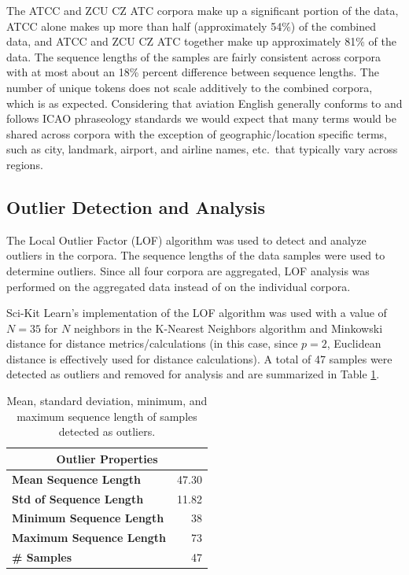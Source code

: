 \documentclass[12pt]{article}
\begin{document}
The ATCC and ZCU CZ ATC corpora make up a significant portion of the data, ATCC alone makes up more than half (approximately 54\%) of the combined
data, and ATCC and ZCU CZ ATC together make up approximately 81\% of the data. The sequence lengths of the samples are fairly consistent across
corpora with at most about an 18\% percent difference between sequence lengths. The number of unique tokens does not scale additively to the
combined corpora, which is as expected. Considering that aviation English generally conforms to and follows ICAO phraseology standards we would expect
that many terms would be shared across corpora with the exception of geographic/location specific terms, such as city, landmark, airport, and airline
names, etc.~that typically vary across regions.

\subsection{Outlier Detection and Analysis}\label{sec:outliers}
The Local Outlier Factor (LOF) algorithm \cite{breunig_lof_2000} was used to detect and analyze outliers in the corpora. The sequence lengths of the
data samples were used to determine outliers. Since all four corpora are aggregated, LOF analysis was performed on the aggregated data instead of on
the individual corpora.

Sci-Kit Learn's \cite{pedregosa_scikit-learn_2011} implementation of the LOF algorithm was used with a value of \(N = 35\) for \(N\) neighbors in the
K-Nearest Neighbors algorithm and Minkowski distance for distance metrics/calculations (in this case, since \(p=2\), Euclidean distance is effectively
used for distance calculations). A total of 47 samples were detected as outliers and removed for analysis and are summarized in Table
\ref{tab:outlier_stats}.

\begin{table}[!t]
    \centering
    \begin{tabular}{l | r}
        \toprule
        \multicolumn{2}{c}{Outlier Properties}   \\
        \midrule
        \textbf{Mean Sequence Length}    & 47.30 \\
        \textbf{Std of Sequence Length}  & 11.82 \\
        \textbf{Minimum Sequence Length} & 38    \\
        \textbf{Maximum Sequence Length} & 73    \\
        \textbf{\# Samples}              & 47    \\
        \bottomrule
    \end{tabular}
    \caption{Mean, standard deviation, minimum, and maximum sequence length of samples detected as outliers.}
    \label{tab:outlier_stats}
\end{table}
\end{document}
